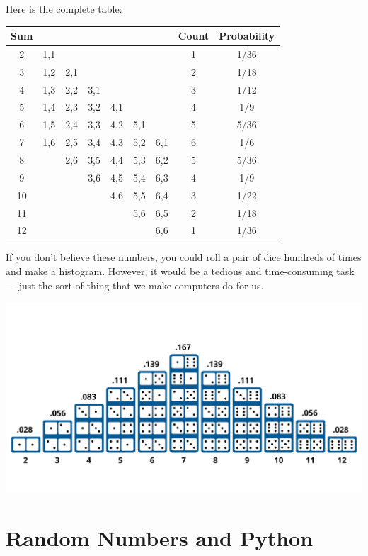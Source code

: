 Here is the complete table:
\begin{tabular}{c| c c c c c c | c | c}
  Sum &     &     &     &     &     &     & Count & Probability \\
  \hline
  2   & 1,1 &     &     &     &     &     &   1    & 1/36 \\
  3   & 1,2 & 2,1 &     &     &     &     &   2    & 1/18 \\
  4   & 1,3 & 2,2 & 3,1 &     &     &     &   3    & 1/12 \\
  5   & 1,4 & 2,3 & 3,2 & 4,1 &     &     &   4    & 1/9 \\
  6   & 1,5 & 2,4 & 3,3 & 4,2 & 5,1 &     &   5    & 5/36 \\
  7   & 1,6 & 2,5 & 3,4 & 4,3 & 5,2 & 6,1 &   6    & 1/6 \\
  8   &     & 2,6 & 3,5 & 4,4 & 5,3 & 6,2 &   5    & 5/36 \\
  9   &     &     & 3,6 & 4,5 & 5,4 & 6,3 &   4    & 1/9 \\
  10  &     &     &     & 4,6 & 5,5 & 6,4 &   3    & 1/22 \\
  11  &     &     &     &     & 5,6 & 6,5 &   2    & 1/18 \\
  12  &     &     &     &     &     & 6,6 &   1    & 1/36
\end{tabular}

If you don't believe these numbers, you could
roll a pair of dice hundreds of times and make a histogram. However, it would be a
tedious and time-consuming task --- just the sort of thing that we make
computers do for us.


\includegraphics[width=1\textwidth]{dice_histogram.png}
\section{Random Numbers and Python}

